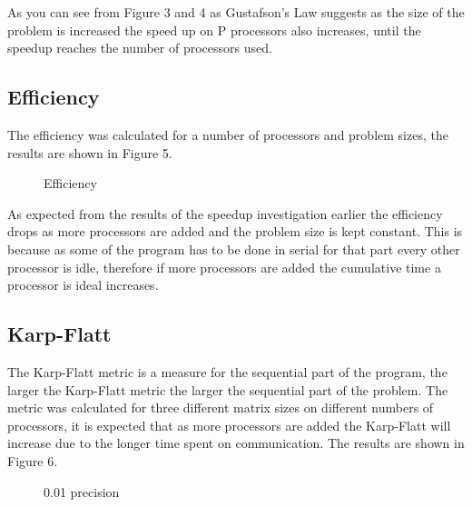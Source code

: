 \documentclass{article}
\begin{document}
  As you can see from Figure 3 and 4 as Gustafson's Law suggests as the size of
  the problem is increased the speed up on P processors also increases, until the
  speedup reaches the number of processors used.

  \subsection{Efficiency}

The efficiency was calculated for a number of processors and problem sizes, the results
are shown in Figure 5.

\begin{figure}[H]
 \centering
 \caption{Efficiency}
 \label{fig:slowdown}
 \end{figure}

As expected from the results of the speedup investigation earlier the efficiency drops
as more processors are added and the problem size is kept constant. This is because
as some of the program has to be done in serial for that part every other processor
is idle, therefore if more processors are added the cumulative time a processor is ideal increases.

\subsection{Karp-Flatt}

The Karp-Flatt metric is a measure for the sequential part of the program, the larger
the Karp-Flatt metric the larger the sequential part of the problem. The metric was
calculated for three different matrix sizes on different numbers of processors, it
is expected that as more processors are added the Karp-Flatt will increase due to
the longer time spent on communication. The results are shown in Figure 6.

\begin{figure}[H]
 \centering
 \caption{0.01 precision}
 \label{fig:karpflatt}
\end{figure}
\end{document}
